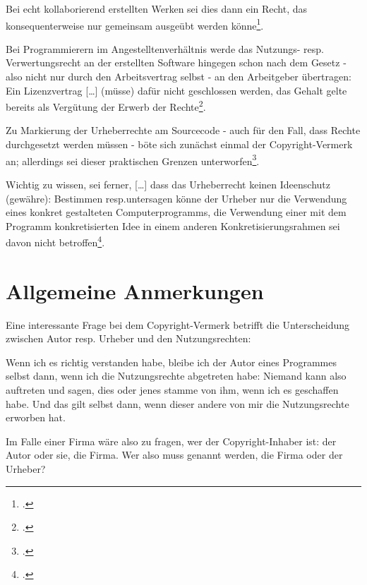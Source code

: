 \documentclass[DIV=calc,BCOR=5mm,11pt,headings=small,oneside,abstract=true, toc=bib]{scrartcl}
\begin{document}
Bei echt kollaborierend erstellten Werken sei dies dann ein Recht, das
konsequenterweise nur gemeinsam ausgeübt werden könne\footcite[vgl.][164]{Kreutzer2008b}. 

Bei Programmierern im Angestelltenverhältnis werde das Nutzungs- resp.
Verwertungsrecht an der erstellten Software hingegen \glqq{}schon nach dem
Gesetz\grqq{} - also nicht nur durch den Arbeitsvertrag selbst - an den
Arbeitgeber übertragen: \glqq{}Ein Lizenzvertrag [\ldots] (müsse) dafür nicht
geschlossen werden\grqq{}, das Gehalt gelte bereits als Vergütung \glqq{}der
Erwerb der Rechte\grqq{}\footcite[vgl.][164]{Kreutzer2008b}.

Zu Markierung der Urheberrechte am Sourcecode - auch für den Fall, dass Rechte
durchgesetzt werden müssen - böte sich zunächst einmal der Copyright-Vermerk an;
allerdings sei dieser praktischen Grenzen unterworfen\grqq{}\footcite[vgl.][166f]{Kreutzer2008b}.

Wichtig zu wissen, sei ferner, \glqq{}[\ldots] dass das Urheberrecht keinen
Ideenschutz (gewähre)\grqq{}: Bestimmen resp.untersagen könne der Urheber
\grqq{}nur die Verwendung eines konkret gestalteten Computerprogramms\grqq{},
die Verwendung einer mit dem Programm konkretisierten Idee in einem anderen
Konkretisierungsrahmen sei davon nicht betroffen\footcite[vgl.][167]{Kreutzer2008b}.

\section{Allgemeine Anmerkungen}

Eine interessante Frage bei dem Copyright-Vermerk betrifft die Unterscheidung
zwischen Autor resp. Urheber und den Nutzungsrechten: 

Wenn ich es richtig
verstanden habe, bleibe ich der Autor eines Programmes selbst dann, wenn ich die
Nutzungsrechte abgetreten habe: Niemand kann also auftreten und sagen, dies oder
jenes stamme von ihm, wenn ich es geschaffen habe. Und das gilt selbst dann,
wenn dieser andere von mir die Nutzungsrechte erworben hat.

Im Falle einer Firma wäre also zu fragen, wer der Copyright-Inhaber ist: der
Autor oder sie, die Firma. Wer also muss genannt werden, die Firma oder der
Urheber?

\small

\end{document}
